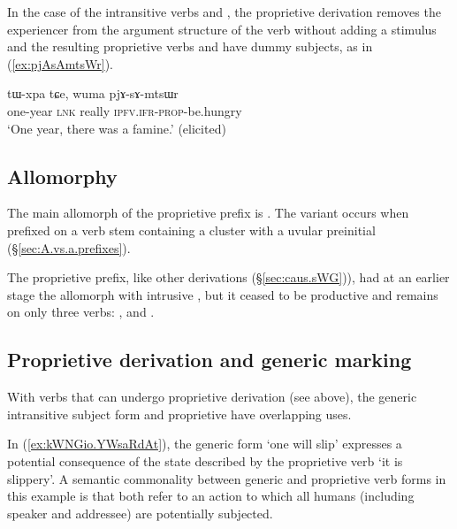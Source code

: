 In the case of the intransitive verbs  and , the proprietive derivation removes the experiencer from the argument structure of the verb without adding a stimulus and the resulting proprietive verbs  and  have dummy subjects, as in (\ref{ex:pjAsAmtsWr}).

\begin{exe}
\ex \label{ex:pjAsAmtsWr}
\gll tɯ-xpa tɕe, wuma pjɤ-sɤ-mtsɯr \\
one-year \textsc{lnk} really \textsc{ipfv}.\textsc{ifr}-\textsc{prop}-be.hungry \\
\glt `One year, there was a famine.' (elicited)
\end{exe}

\subsection{Allomorphy} \label{sec:proprietive.allomorphy}
  
The main allomorph of the proprietive prefix is . The variant  occurs when prefixed on a verb stem containing a cluster with a uvular preinitial (§\ref{sec:A.vs.a.prefixes}). 

The proprietive prefix, like other derivations (§\ref{sec:caus.sWG})), had at an earlier stage the allomorph  with intrusive , but it ceased to be productive and remains on only three verbs: ,  and .

\subsection{Proprietive derivation and generic marking} \label{sec:proprietive.generic}
With verbs that can undergo proprietive derivation (see above), the generic intransitive subject  form and proprietive have overlapping uses. 

In (\ref{ex:kWNGio.YWsaRdAt}), the generic form  `one will slip' expresses a potential consequence of the state described by the proprietive verb  `it is slippery'. A semantic commonality between generic and proprietive verb forms in this example is that both refer to an action to which all humans (including speaker and addressee) are potentially subjected.


